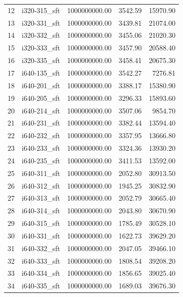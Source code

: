 \begin{tabular}{llrrr}
12 &  i320-315\_sft & 1000000000.00 &           3542.59 &    15970.90 \\
13 &  i320-331\_sft & 1000000000.00 &           3439.81 &    21074.00 \\
14 &  i320-332\_sft & 1000000000.00 &           3455.06 &    21020.30 \\
15 &  i320-333\_sft & 1000000000.00 &           3457.90 &    20588.40 \\
16 &  i320-335\_sft & 1000000000.00 &           3458.41 &    20675.30 \\
17 &  i640-135\_sft & 1000000000.00 &           3542.27 &     7276.81 \\
18 &  i640-201\_sft & 1000000000.00 &           3388.17 &    15380.90 \\
19 &  i640-205\_sft & 1000000000.00 &           3296.33 &    15893.60 \\
20 &  i640-214\_sft & 1000000000.00 &           3507.06 &     9854.70 \\
21 &  i640-231\_sft & 1000000000.00 &           3382.44 &    13594.40 \\
22 &  i640-232\_sft & 1000000000.00 &           3357.95 &    13666.80 \\
23 &  i640-233\_sft & 1000000000.00 &           3324.36 &    13930.20 \\
24 &  i640-235\_sft & 1000000000.00 &           3411.53 &    13592.00 \\
25 &  i640-311\_sft & 1000000000.00 &           2052.80 &    30913.50 \\
26 &  i640-312\_sft & 1000000000.00 &           1945.25 &    30832.90 \\
27 &  i640-313\_sft & 1000000000.00 &           2052.79 &    30665.40 \\
28 &  i640-314\_sft & 1000000000.00 &           2043.80 &    30670.90 \\
29 &  i640-315\_sft & 1000000000.00 &           1785.49 &    30528.10 \\
30 &  i640-331\_sft & 1000000000.00 &           1622.73 &    39629.20 \\
31 &  i640-332\_sft & 1000000000.00 &           2047.05 &    39466.10 \\
32 &  i640-333\_sft & 1000000000.00 &           1808.54 &    39208.20 \\
33 &  i640-334\_sft & 1000000000.00 &           1856.65 &    39025.40 \\
34 &  i640-335\_sft & 1000000000.00 &           1689.03 &    39676.30 \\
\bottomrule
\end{tabular}
